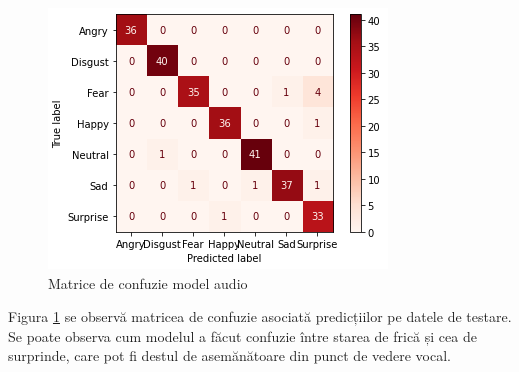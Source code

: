 \documentclass[a4paper, 12pt]{report}
\begin{document}
	\begin{figure}[H]
		\begin{center}
			\includegraphics[scale=0.7]{images/audio_confusion_matrix.png}
		\end{center}
		\caption{Matrice de confuzie model audio}
		\label{fig:audio_confusion_matrix}
	\end{figure}

	Figura \ref{fig:audio_confusion_matrix} se observă matricea de confuzie asociată predicțiilor pe datele de testare. Se poate observa cum modelul a făcut confuzie între starea de frică și cea de surprinde, care pot fi destul de asemănătoare din punct de vedere vocal.
	
	
	\clearpage
\end{document}

